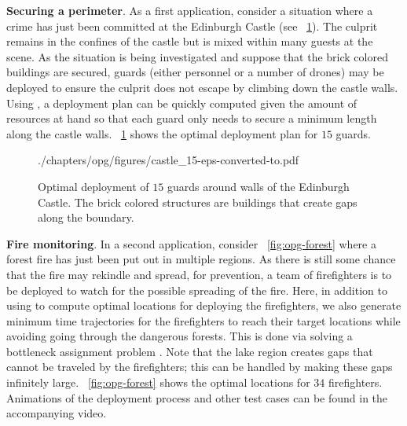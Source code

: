 \noindent\textbf{Securing a perimeter}. As a first application, consider
a situation where a crime has just been committed at the Edinburgh 
Castle (see ~\ref{fig:opg-edinburgh}). The culprit remains in the confines 
of the castle but is mixed within many guests at the scene. As the 
situation is being investigated and suppose that the brick colored 
buildings are secured, guards (either personnel or a number of drones) may 
be deployed to ensure the culprit does not escape by climbing down the 
castle walls. Using \algoSRG, a deployment plan can be quickly computed 
given the amount of resources at hand so that each guard only needs to 
secure a minimum length along the castle walls. ~\ref{fig:opg-edinburgh} 
shows the optimal deployment plan for $15$ guards. 

\begin{figure}[ht]
	\vspace*{-2mm}
	\begin{center}
		\begin{overpic}[width=0.4\textwidth, tics=5]{./chapters/opg/figures/castle_15-eps-converted-to.pdf}
		\end{overpic}
	\end{center}
	\vspace*{-4.5mm}
	\caption[Optimal deployment of $15$ guards around walls of the Edinburgh Castle]
	{\label{fig:opg-edinburgh} Optimal deployment of $15$ guards around 
	walls of the Edinburgh Castle. The brick colored structures are buildings 
	that create gaps along the boundary.}
\end{figure}

\noindent\textbf{Fire monitoring}. In a second application, consider 
~\ref{fig:opg-forest} where a forest fire has just been put out in 
multiple regions. As there is still some chance that the fire may 
rekindle and spread, for prevention, a team of firefighters is to be 
deployed to watch for the possible spreading of the fire. Here, in 
addition to using \algoMRG to compute optimal locations for deploying 
the firefighters, we also generate minimum time trajectories for the 
firefighters to reach their target locations while avoiding going 
through the dangerous forests. This is done via solving a bottleneck 
assignment problem \cite{burkard1999linear}.
Note that the lake region creates gaps that cannot be traveled by the 
firefighters; this can be handled by making these gaps infinitely large. 
~\ref{fig:opg-forest} shows the optimal locations for $34$ firefighters. 
Animations of the deployment process and other test cases can be found 
in the accompanying video. 

